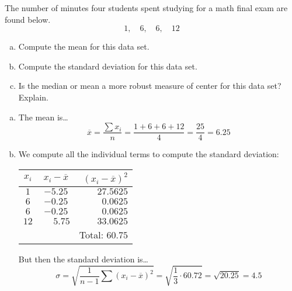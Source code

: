 \documentclass[12pt,letterpaper]{exam}
\begin{document}
\begin{questions}
\begin{enumerate}[(a)]
\begin{center}
	\end{center}
\end{enumerate}



\newpage
\question[10] The number of minutes four students spent studying for a math final exam are found below. 
	\[
	1, \quad 6, \quad 6, \quad 12
	\]

\begin{enumerate}[(a)]
\item Compute the mean for this data set.
\item Compute the standard deviation for this data set. 
\item Is the median or mean a more robust measure of center for this data set? Explain. 
\end{enumerate} \pspace

\sol 
\begin{enumerate}[(a)]
\item The mean is\dots
	\[
	\overline{x} = \dfrac{\sum x_i}{n} = \dfrac{1 + 6 + 6 + 12}{4} = \dfrac{25}{4} = 6.25
	\] \pspace

\item We compute all the individual terms to compute the standard deviation: \par
	\begin{table}[ht]
	\centering
	\begin{tabular}{ccr}
	$x_i$ & $x_i - \overline{x}$ & $(x_i - \overline{x})^2$ \\ \hline
	$1$ & $-5.25$ & $27.5625$ \\
	$6$ & $-0.25$ & $0.0625$ \\
	$6$ & $-0.25$ & $0.0625$ \\
	$12$ & $\phantom{-}5.75$ & $33.0625$ \\ \cline{3-3}
		& 			& Total: $60.75$
	\end{tabular}
	\end{table} \par
But then the standard deviation is\dots
	\[
	\sigma = \sqrt{ \dfrac{1}{n - 1} \sum (x_i - \overline{x})^2} = \sqrt{ \dfrac{1}{3} \cdot 60.72} = \sqrt{20.25} = 4.5
	\] \pspace
 

\end{enumerate}
\end{questions}
\end{document}
